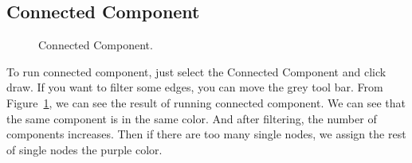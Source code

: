 \documentclass{article}
\begin{document}
 \subsection{Connected Component}
\begin{figure}[H]
\centering
{}
   \caption{Connected Component.}
    \label{fig:connected component}
\end{figure}
To run connected component, just select the Connected Component and click draw. If you want to filter some edges, you can move the grey tool bar. From Figure~\ref{fig:connected component}, we can see the result of running connected component. We can see that the same component is in the same color. And after filtering, the number of components increases. Then if there are too many single nodes, we assign the rest of single nodes the purple color.\\ 
\end{document}
